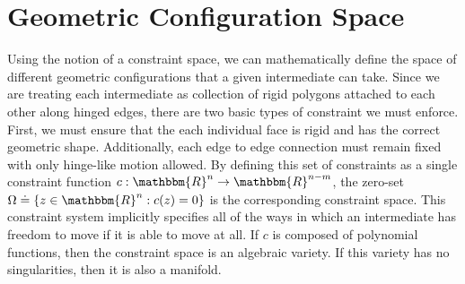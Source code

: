 
%
%



\section{Geometric Configuration Space}
%



Using the notion of a constraint space, we can mathematically define the space of different geometric configurations that a given intermediate can take. Since we are treating each intermediate as collection of rigid polygons attached to each other along hinged edges, there are two basic types of constraint we must enforce. First, we must ensure that the each individual face is rigid and has the correct geometric shape. Additionally, each edge to edge connection must remain fixed with only hinge-like motion allowed. By defining this set of constraints as a single constraint function $c: \mathbbm{R}^n \to \mathbbm{R}^{n-m}$, the zero-set $\Omega \doteq \{z \in \mathbbm{R}^n : c(z) = 0\}$ is the corresponding constraint space. This constraint system implicitly specifies all of the ways in which an intermediate has freedom to move if it is able to move at all. If $c$ is composed of polynomial functions, then the constraint space is an algebraic variety. If this variety has no singularities, then it is also a manifold. 


